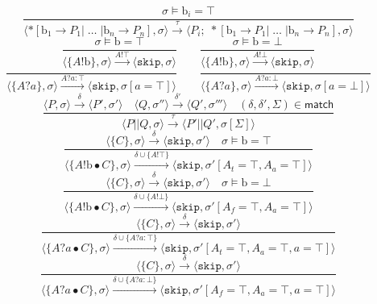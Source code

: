 \documentclass[times, 10pt]{article}
\begin{document}
$$    \frac{\sigma \models \mathrm{b}_i = \top} {\langle *[ \mathrm{b}_1 \rightarrow P_1  | \; \ldots \; | \mathrm{b}_n \rightarrow P_n ] , \sigma \rangle \xrightarrow{\tau} \langle P_i;\;*[ \mathrm{b}_1 \rightarrow P_1  | \; \ldots \; | \mathrm{b}_n \rightarrow P_n ] , \sigma\rangle  } $$$$
    \frac{\sigma \models \mathrm{b} = \top}{\langle \{A!\mathrm{b}\}, \sigma \rangle \xrightarrow{A!\top} \langle \mathtt{skip}, \sigma \rangle} \qquad
    \frac{\sigma \models \mathrm{b} = \bot}{\langle \{A!\mathrm{b}\}, \sigma \rangle \xrightarrow{A!\bot} \langle \mathtt{skip}, \sigma \rangle} $$$$
    \frac{}{\langle \{A?a\}, \sigma \rangle \xrightarrow{A?a : \top} \langle \mathtt{skip}, \sigma[a = \top] \rangle} \qquad
    \frac{}{\langle \{A?a\}, \sigma \rangle \xrightarrow{A?a : \bot} \langle \mathtt{skip}, \sigma[a = \bot] \rangle} $$$$
    \frac{\langle P, \sigma \rangle \xrightarrow{\delta} \langle P', \sigma' \rangle \quad \langle Q, \sigma'' \rangle \xrightarrow{\delta'} \langle Q', \sigma''' \rangle \quad (\delta, \delta', \Sigma) \in \mathsf{match}}{\langle P || Q, \sigma \rangle \xrightarrow{\tau} \langle P' || Q', \sigma[\Sigma] \rangle} $$$$
    \frac{\langle \{C\}, \sigma \rangle \xrightarrow{\delta} \langle \mathtt{skip}, \sigma' \rangle \quad \sigma \models \mathrm{b} = \top}{\langle \{A!\mathrm{b} \bullet C\}, \sigma \rangle \xrightarrow{\delta \cup \{A!\top\}} \langle \mathtt{skip}, \sigma'[A_t = \top, A_a = \top] \rangle} $$$$
    \frac{\langle \{C\}, \sigma \rangle \xrightarrow{\delta} \langle \mathtt{skip}, \sigma' \rangle \quad \sigma \models \mathrm{b} = \bot}{\langle \{A!\mathrm{b} \bullet C\}, \sigma \rangle \xrightarrow{\delta \cup \{A!\bot\}} \langle \mathtt{skip}, \sigma'[A_f = \top, A_a = \top] \rangle} $$$$
    \frac{\langle \{C\}, \sigma \rangle \xrightarrow{\delta} \langle \mathtt{skip}, \sigma' \rangle}{\langle \{A?a \bullet C\}, \sigma \rangle \xrightarrow{\delta \cup \{A?a : \top\}} \langle \mathtt{skip}, \sigma'[A_t = \top, A_a = \top, a = \top] \rangle} $$$$
    \frac{\langle \{C\}, \sigma \rangle \xrightarrow{\delta} \langle \mathtt{skip}, \sigma' \rangle}{\langle \{A?a \bullet C\}, \sigma \rangle \xrightarrow{\delta \cup \{A?a : \bot\}} \langle \mathtt{skip}, \sigma'[A_f = \top, A_a = \top, a = \top] \rangle} $$$$
$$
\end{document}
